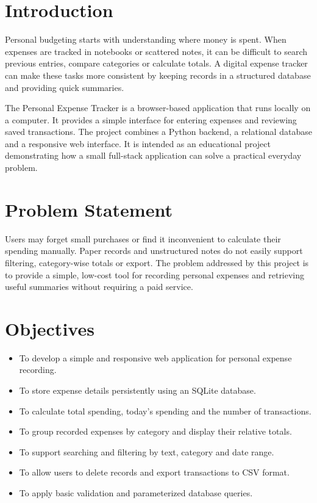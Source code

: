 \documentclass[11pt,a4paper]{report}
\begin{document}
\section{Introduction}
Personal budgeting starts with understanding where money is spent. When expenses are tracked in notebooks or scattered notes, it can be difficult to search previous entries, compare categories or calculate totals. A digital expense tracker can make these tasks more consistent by keeping records in a structured database and providing quick summaries.

The Personal Expense Tracker is a browser-based application that runs locally on a computer. It provides a simple interface for entering expenses and reviewing saved transactions. The project combines a Python backend, a relational database and a responsive web interface. It is intended as an educational project demonstrating how a small full-stack application can solve a practical everyday problem.

\section{Problem Statement}
Users may forget small purchases or find it inconvenient to calculate their spending manually. Paper records and unstructured notes do not easily support filtering, category-wise totals or export. The problem addressed by this project is to provide a simple, low-cost tool for recording personal expenses and retrieving useful summaries without requiring a paid service.

\section{Objectives}
\begin{itemize}[leftmargin=*]
\item To develop a simple and responsive web application for personal expense recording.
\item To store expense details persistently using an SQLite database.
\item To calculate total spending, today's spending and the number of transactions.
\item To group recorded expenses by category and display their relative totals.
\item To support searching and filtering by text, category and date range.
\item To allow users to delete records and export transactions to CSV format.
\item To apply basic validation and parameterized database queries.
\end{itemize}
\end{document}

